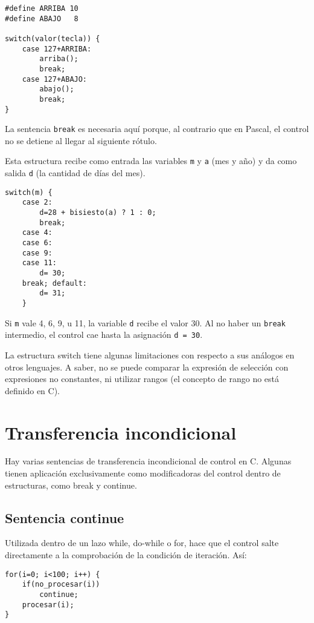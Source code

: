 \begin{lstlisting}
#define ARRIBA 10
#define ABAJO   8

switch(valor(tecla)) {
    case 127+ARRIBA:
        arriba();
        break;
    case 127+ABAJO:
        abajo();
        break;
}
\end{lstlisting}
La sentencia \lstinline{break}
 es necesaria aquí porque, al contrario que en Pascal, el
control no se detiene al llegar al siguiente rótulo.

\begin{ejemplo}
Esta estructura recibe como entrada las variables \lstinline{m} y \lstinline{a} (mes y año) y da como
salida \lstinline{d} (la cantidad de días del mes).

\begin{lstlisting}
switch(m) {
    case 2:
        d=28 + bisiesto(a) ? 1 : 0;
        break;
    case 4:
    case 6:
    case 9:
    case 11:
        d= 30;
    break; default:
        d= 31;
    }
\end{lstlisting}
Si \lstinline{m} vale 4, 6, 9, u 11, la variable \lstinline{d} recibe el valor 30. Al no haber un \lstinline{break}
intermedio, el control cae hasta la asignación \lstinline{d = 30}.

La estructura switch tiene algunas limitaciones con respecto a sus análogos en otros lenguajes. A saber, no se puede comparar la expresión de selección con
expresiones no constantes, ni utilizar rangos (el concepto de rango no está
definido en C).
\end{ejemplo}

\section{Transferencia incondicional}
Hay varias sentencias de transferencia incondicional de control en C. Algunas
tienen aplicación exclusivamente como modificadoras del control dentro de
estructuras, como break y continue.

\subsection{Sentencia continue}
Utilizada dentro de un lazo while, do-while o for, hace que el control salte
directamente a la comprobación de la condición de iteración. Así:
\begin{lstlisting}
for(i=0; i<100; i++) {
    if(no_procesar(i))
        continue;
    procesar(i);
}
\end{lstlisting}

